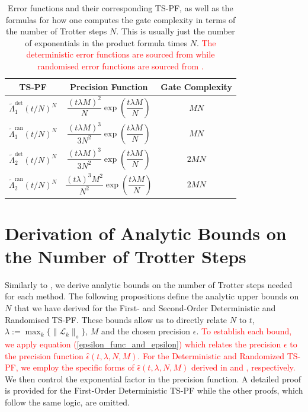 \documentclass[pdflatex,sn-mathphys-num]{sn-jnl}%
\renewcommand{\arraystretch}{2.}
\begin{document}
\begin{table}[h!]
\centering
\renewcommand{\arraystretch}{2} %
\begin{tabular}{|c|c|c|}
\hline
\textbf{TS-PF} & \textbf{Precision Function} & \textbf{Gate Complexity} \\ %
\hline
$\tilde{\Lambda}_{1}^{\mathrm{det}}(t/N)^{N}$ & $\dfrac{(t\lambda M)^{2}}{N}\exp\left(\dfrac{t\lambda M}{N}\right)$ & $MN$ \\[15pt] %
$\tilde{\Lambda}_{1}^{\mathrm{ran}}(t/N)^{N}$ & $\dfrac{(t\lambda M)^{3}}{3N^{2}}\exp\left(\dfrac{t\lambda M}{N}\right)$ & $MN$ \\[15pt]
$\tilde{\Lambda}_{2}^{\mathrm{det}}(t/N)^{N}$ & $\dfrac{(t\lambda M)^{3}}{3N^{2}}\exp\left(\dfrac{t\lambda M}{N}\right)$ & $2MN$\\[15pt]
$\tilde{\Lambda}_{2}^{\mathrm{ran}}(t/N)^{N}$ & $\dfrac{(t\lambda)^{3}M^{2}}{N^{2}}\exp\left(\dfrac{t\lambda M}{N}\right)$& $2MN$ \\[5pt]
\hline
\end{tabular}
\caption{Error functions and their corresponding TS-PF, as well as the formulas for how one computes the gate complexity in terms of the number of Trotter steps $N$. This is usually just the number of exponentials in the product formula times $N$. \textcolor{red}{The deterministic error functions are sourced from \cite{suzuki1990fractal} while randomised error functions are sourced from \cite{david2024faster}.}}
\label{tab:ts_formulas}
\end{table}

\section{Derivation of Analytic Bounds on the Number of Trotter Steps}\label{sec_analytic_bounds}

Similarly to \cite{childs2018toward}, we derive analytic bounds on the number of Trotter steps needed for each method. The following propositions define the analytic upper bounds on $N$ that we have derived for the First- and Second-Order Deterministic and Randomised TS-PF. These bounds allow us to directly relate $N$ to $t$, $\lambda := \max_{k}\{ \|\mathcal{L}_k\|_\diamond\}$, $M$ and the chosen precision $\epsilon$. \textcolor{red}{To establish each bound, we apply equation (\ref{epsilon_func_and_epsilon}) which relates the precision $\epsilon$ to the precision function $\hat\epsilon(t,\lambda,N,M)$. For the Deterministic and Randomized TS-PF, we employ the specific forms of $\hat\epsilon(t,\lambda,N,M)$ derived in \cite{suzuki1990fractal} and \cite{david2024faster}, respectively.} We then control the exponential factor in the precision function. A detailed proof is provided for the First-Order Deterministic TS-PF while the other proofs, which follow the same logic, are omitted. 
\end{document}
